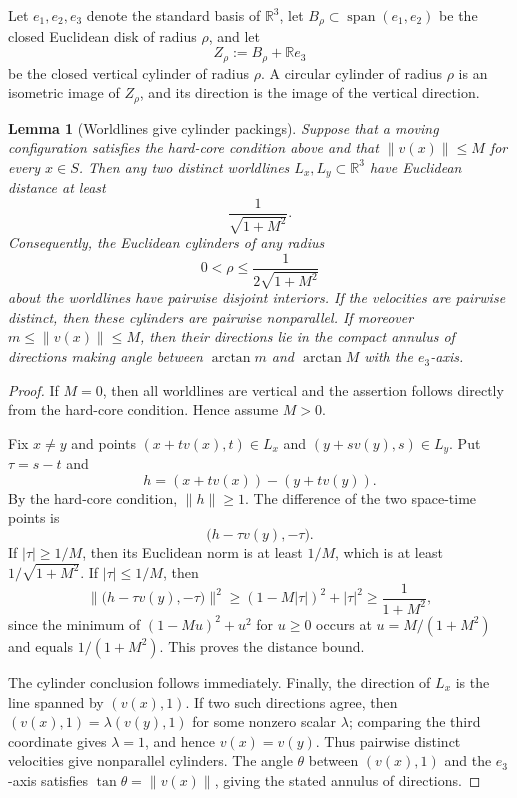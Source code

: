 \documentclass[11pt]{article}
\newtheorem{lemma}[theorem]{Lemma}
\theoremstyle{remark}
\begin{document}
Let $e_1,e_2,e_3$ denote the standard basis of $\mathbb R^3$, let $B_\rho\subset \operatorname{span}(e_1,e_2)$ be the closed Euclidean disk of radius $\rho$, and let
\[
Z_\rho:=B_\rho+\mathbb R e_3
\]
be the closed vertical cylinder of radius $\rho$. A circular cylinder of radius $\rho$ is an isometric image of $Z_\rho$, and its direction is the image of the vertical direction.

\begin{lemma}[Worldlines give cylinder packings]\label{lem:worldline-cylinder}
Suppose that a moving configuration satisfies the hard-core condition above and that $\|v(x)\|\le M$ for every $x\in S$. Then any two distinct worldlines $L_x,L_y\subset\mathbb R^3$ have Euclidean distance at least
\[
\frac{1}{\sqrt{1+M^2}}.
\]
Consequently, the Euclidean cylinders of any radius
\[
0<\rho\le \frac{1}{2\sqrt{1+M^2}}
\]
about the worldlines have pairwise disjoint interiors. If the velocities are pairwise distinct, then these cylinders are pairwise nonparallel. If moreover $m\le \|v(x)\|\le M$, then their directions lie in the compact annulus of directions making angle between $\arctan m$ and $\arctan M$ with the $e_3$-axis.
\end{lemma}

\begin{proof}
If $M=0$, then all worldlines are vertical and the assertion follows directly from the hard-core condition. Hence assume $M>0$.

Fix $x\ne y$ and points $(x+t v(x),t)\in L_x$ and $(y+s v(y),s)\in L_y$. Put $\tau=s-t$ and
\[
h=(x+t v(x))-(y+t v(y)).
\]
By the hard-core condition, $\|h\|\ge 1$. The difference of the two space-time points is
\[
\bigl(h-\tau v(y),-\tau\bigr).
\]
If $|\tau|\ge 1/M$, then its Euclidean norm is at least $1/M$, which is at least $1/\sqrt{1+M^2}$. If $|\tau|\le 1/M$, then
\[
\bigl\|\bigl(h-\tau v(y),-\tau\bigr)\bigr\|^2
\ge (1-M|\tau|)^2+|\tau|^2
\ge \frac{1}{1+M^2},
\]
since the minimum of $(1-Mu)^2+u^2$ for $u\ge 0$ occurs at $u=M/(1+M^2)$ and equals $1/(1+M^2)$. This proves the distance bound.

The cylinder conclusion follows immediately. Finally, the direction of $L_x$ is the line spanned by $(v(x),1)$. If two such directions agree, then $(v(x),1)=\lambda(v(y),1)$ for some nonzero scalar $\lambda$; comparing the third coordinate gives $\lambda=1$, and hence $v(x)=v(y)$. Thus pairwise distinct velocities give nonparallel cylinders. The angle $\theta$ between $(v(x),1)$ and the $e_3$-axis satisfies $\tan\theta=\|v(x)\|$, giving the stated annulus of directions.
\end{proof}
\end{document}
